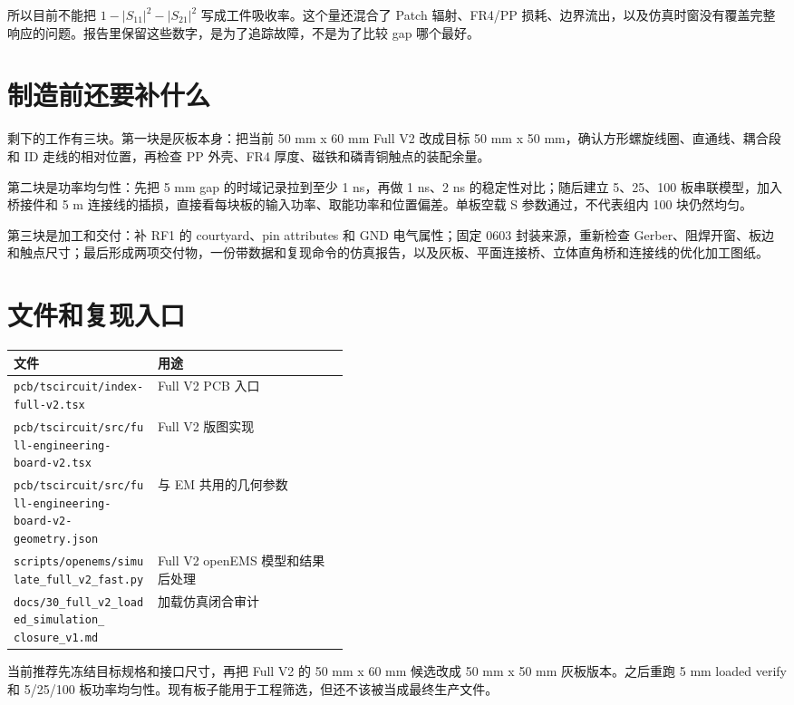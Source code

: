\documentclass[UTF8,a4paper,11pt]{ctexart}
\begin{document}
所以目前不能把 $1-|S_{11}|^2-|S_{21}|^2$ 写成工件吸收率。这个量还混合了 Patch 辐射、FR4/PP 损耗、边界流出，以及仿真时窗没有覆盖完整响应的问题。报告里保留这些数字，是为了追踪故障，不是为了比较 gap 哪个最好。

\section{制造前还要补什么}

剩下的工作有三块。第一块是灰板本身：把当前 50 mm x 60 mm Full V2 改成目标 50 mm x 50 mm，确认方形螺旋线圈、直通线、耦合段和 ID 走线的相对位置，再检查 PP 外壳、FR4 厚度、磁铁和磷青铜触点的装配余量。

第二块是功率均匀性：先把 5 mm gap 的时域记录拉到至少 1 ns，再做 1 ns、2 ns 的稳定性对比；随后建立 5、25、100 板串联模型，加入桥接件和 5 m 连接线的插损，直接看每块板的输入功率、取能功率和位置偏差。单板空载 S 参数通过，不代表组内 100 块仍然均匀。

第三块是加工和交付：补 RF1 的 courtyard、pin attributes 和 GND 电气属性；固定 0603 封装来源，重新检查 Gerber、阻焊开窗、板边和触点尺寸；最后形成两项交付物，一份带数据和复现命令的仿真报告，以及灰板、平面连接桥、立体直角桥和连接线的优化加工图纸。

\section{文件和复现入口}

\begin{tabularx}{\linewidth}{p{0.43\linewidth} X}
\toprule
文件 & 用途 \\
\midrule
\scriptsize\texttt{pcb/tscircuit/index-full-v2.tsx} & Full V2 PCB 入口 \\
\scriptsize\texttt{pcb/tscircuit/src/full-engineering-board-v2.tsx} & Full V2 版图实现 \\
\shortstack[l]{\scriptsize\texttt{pcb/tscircuit/src/full-engineering-board-v2-}\\[-1pt]\scriptsize\texttt{geometry.json}} & 与 EM 共用的几何参数 \\
\scriptsize\texttt{scripts/openems/simulate\_full\_v2\_fast.py} & Full V2 openEMS 模型和结果后处理 \\
\shortstack[l]{\scriptsize\texttt{docs/30\_full\_v2\_loaded\_simulation\_}\\[-1pt]\scriptsize\texttt{closure\_v1.md}} & 加载仿真闭合审计 \\
\bottomrule
\end{tabularx}

\vspace{4mm}
当前推荐先冻结目标规格和接口尺寸，再把 Full V2 的 50 mm x 60 mm 候选改成 50 mm x 50 mm 灰板版本。之后重跑 5 mm loaded verify 和 5/25/100 板功率均匀性。现有板子能用于工程筛选，但还不该被当成最终生产文件。
\end{document}
